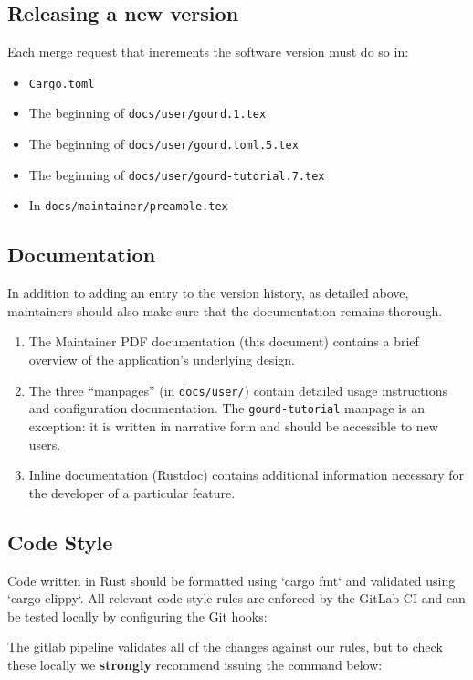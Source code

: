 \subsection{Releasing a new version}

Each merge request that increments the software version must do so in:

\begin{itemize}
  \item \texttt{Cargo.toml}
  \item The beginning of \texttt{docs/user/gourd.1.tex}
  \item The beginning of \texttt{docs/user/gourd.toml.5.tex}
  \item The beginning of \texttt{docs/user/gourd-tutorial.7.tex}
  \item In \texttt{docs/maintainer/preamble.tex}
\end{itemize}

\subsection{Documentation}

In addition to adding an entry to the version history, as detailed above, maintainers should also make sure that the
documentation remains thorough.
\begin{enumerate}
  \item The Maintainer PDF documentation (this document) contains a brief overview of the application's underlying design.
  \item The three ``manpages'' (in \verb|docs/user/|) contain detailed usage instructions and configuration documentation.
    The \texttt{gourd-tutorial} manpage is an exception: it is written in narrative form and should be accessible to new users.
  \item Inline documentation (Rustdoc) contains additional information necessary for the developer of a particular feature.
\end{enumerate}

\subsection{Code Style}

Code written in Rust should be formatted using `cargo fmt` and validated using `cargo clippy`.
All relevant code style rules are enforced by the GitLab CI and can be tested locally
by configuring the Git hooks:

The gitlab pipeline validates all of the changes against our rules, but to check these locally
we \textbf{strongly} recommend issuing the command below:

